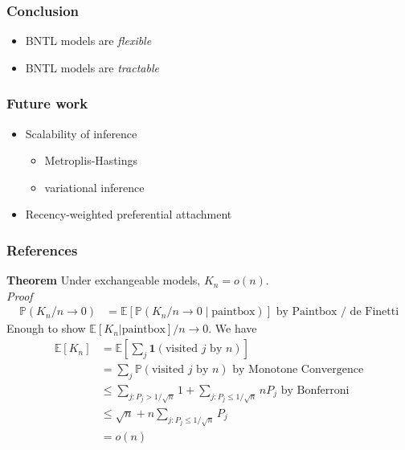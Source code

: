 \documentclass[final,hyperref={pdfpagelabels=false},noamsthm]{beamer}
\def\bbE{\mathbb{E}}
\newcommand{\prob}{\mathbb{P}}
\def\indicator{\mathbf{1}}
\begin{document}
\begin{frame}
	\frametitle{Conclusion}
	\begin{itemize}
		\item BNTL models are \textit{flexible}
		\item BNTL models are \textit{tractable}
	\end{itemize}
\end{frame}

\begin{frame}
	\frametitle{Future work}
	\begin{itemize}
		\item Scalability of inference
		\begin{itemize}
			\item Metroplis-Hastings
			\item variational inference \cite{linderman2017}
		\end{itemize}
		\item Recency-weighted preferential attachment
	\end{itemize}
\end{frame}

\begin{frame}
	\frametitle{References}
	\tiny{
	}
\end{frame}

\begin{frame}
	\textbf{Theorem} Under exchangeable models, $K_n = o(n)$. \\
	\textit{Proof}
	\begin{align*}
	\prob (K_n / n \to 0) &= \bbE[\prob(K_n/n \to 0 \mid \text{paintbox})] \text{ by Paintbox / de Finetti}
	\end{align*}
	Enough to show $\bbE[K_n | \text{paintbox}]/n \to 0$.
	We have
	\begin{align*}
	\bbE[K_n] &= \bbE\left[ \sum_j \indicator (\text{visited } j \text{ by }n) \right]\\
	&=\sum_j \prob(\text{visited } j \text{ by }n) \text{ by Monotone Convergence} \\
	&\le \sum_{j: P_j > 1/\sqrt{n}} 1 + \sum_{j: P_j \le 1/\sqrt{n}} nP_j \text{ by Bonferroni}\\
	&\le \sqrt{n} + n \sum_{j: P_j \le 1/\sqrt{n}} P_j \\
	&=o(n)
	\end{align*}
\end{frame}
\end{document}
